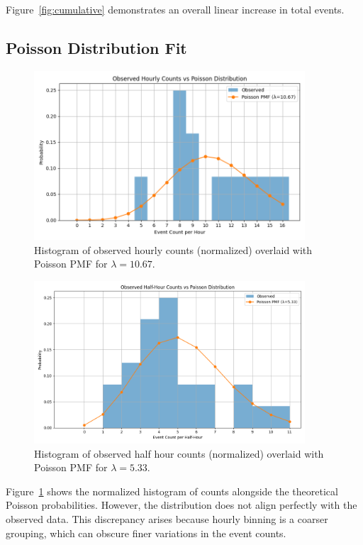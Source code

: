 \documentclass[12pt]{article}
\begin{document}
	Figure~\ref{fig:cumulative} demonstrates an overall linear increase in total events.
	
	\subsection{Poisson Distribution Fit}
	\begin{figure}[H]
		\centering
		\includegraphics[width=0.9\textwidth]{../Data and notebooks/figures/poisson_fit_hourly_counts.png}
		\caption{Histogram of observed hourly counts (normalized) overlaid with Poisson PMF for $\lambda=10.67$.}
		\label{fig:poisson}
	\end{figure}
	
	\begin{figure}[H]
		\centering
		\includegraphics[width=0.9\textwidth]{../Data and notebooks/figures/poisson_fit_halfhourly_counts.png}
		\caption{Histogram of observed half hour counts (normalized) overlaid with Poisson PMF for $\lambda=5.33$.}
		\label{fig:poissonhalfhour}
	\end{figure}
	
	Figure~\ref{fig:poisson} shows the normalized histogram of counts alongside the theoretical Poisson probabilities. However, the distribution does not align perfectly with the observed data. This discrepancy arises because hourly binning is a coarser grouping, which can obscure finer variations in the event counts.
	
\end{document}
